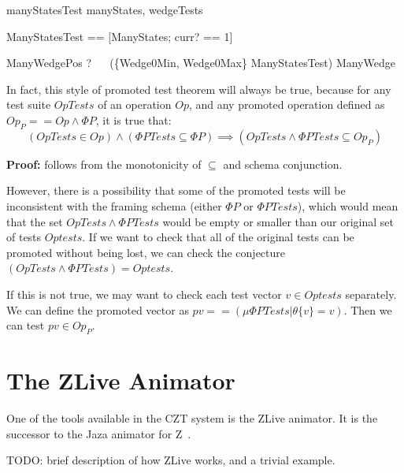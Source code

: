 \documentclass{llncs}
\begin{document}
\begin{zsection}
  \SECTION manyStatesTest \parents manyStates, wedgeTests
\end{zsection}

\begin{zed}
  \Phi ManyStatesTest == [\Phi ManyStates; curr? == 1]
\end{zed}

\begin{theorem}{ManyWedgePos}
  \vdash? ~~ (\{Wedge0Min, Wedge0Max\} \land \Phi ManyStatesTest)
      \subseteq ManyWedge
\end{theorem}

In fact, this style of promoted test theorem will always be true,
because for any test suite $OpTests$ of an operation $Op$,
and any promoted operation defined as $Op_P == Op \land \Phi P$,
it is true that:
\[
   (OpTests \in Op) \land (\Phi PTests \subseteq \Phi P)
   \implies (OpTests \land \Phi PTests \subseteq Op_P)
\]

\textbf{Proof:} follows from the monotonicity of $\subseteq$ and schema
conjunction.

However, there is a possibility that some of the promoted tests
will be inconsistent with the framing schema (either $\Phi P$ or $\Phi
PTests$), which would mean that the set $OpTests \land \Phi PTests$
would be empty or smaller than our original set of tests $Optests$.
If we want to check that all of the original tests can be promoted without
being lost, we can check the conjecture 
$(OpTests \land \Phi PTests) = Optests$.

If this is not true, we may want to check each test vector $v \in Optests$
separately.  We can define the promoted vector as 
$pv == (\mu \Phi PTests | \theta \{v\} = v)$.
Then we can test $pv \in Op_P$. 



\section{The ZLive Animator}

One of the tools available in the CZT system is the ZLive animator.
It is the successor to the Jaza animator for Z~\cite{utting:jaza}.

TODO: brief description of how ZLive works, and a trivial example.


\end{document}
